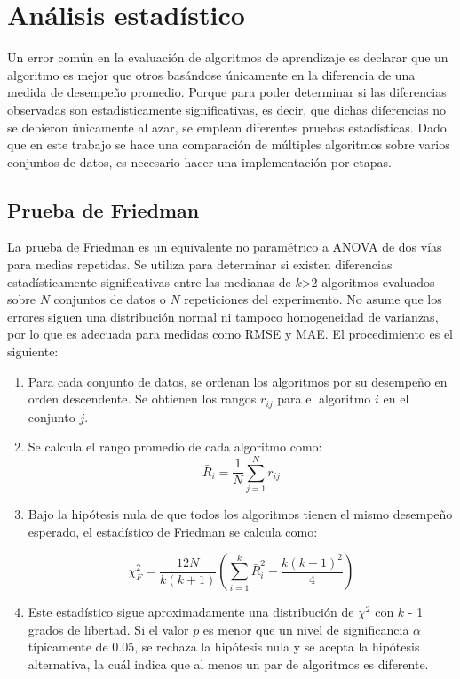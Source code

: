 \section{Análisis estadístico}

Un error común en la evaluación de algoritmos de aprendizaje es declarar que un algoritmo es mejor que otros basándose únicamente en la diferencia de una medida de desempeño promedio. Porque para poder determinar si las diferencias observadas son estadísticamente significativas, es decir, que dichas diferencias no se debieron únicamente al azar, se emplean diferentes pruebas estadísticas. Dado que en este trabajo se hace una comparación de múltiples algoritmos sobre varios conjuntos de datos, es necesario hacer una implementación por etapas.

\subsection{Prueba de Friedman}

La prueba de Friedman es un equivalente no paramétrico a ANOVA de dos vías para medias repetidas. Se utiliza para determinar si existen diferencias estadísticamente significativas entre las medianas de $k$>2 algoritmos evaluados sobre $N$ conjuntos de datos o $N$ repeticiones del experimento. No asume que los errores siguen una distribución normal ni tampoco homogeneidad de varianzas, por lo que es adecuada para medidas como RMSE y MAE. El procedimiento es el siguiente:

\begin{enumerate}
    \item Para cada conjunto de datos, se ordenan los algoritmos por su desempeño en orden descendente. Se obtienen los rangos $r_{ij}$ para el algoritmo $i$ en el conjunto $j$.

    \item Se calcula el rango promedio de cada algoritmo como:
\[
\bar{R}_i = \frac{1}{N} \sum_{j=1}^{N} r_{ij}
\]

    \item Bajo la hipótesis nula de que todos los algoritmos tienen el mismo desempeño esperado, el estadístico de Friedman se calcula como:

\[
\chi_F^2 = \frac{12N}{k(k+1)} \left( \sum_{i=1}^{k} \bar{R}_i^{2} - \frac{k(k+1)^{2}}{4} \right)
\]

    \item Este estadístico sigue aproximadamente una distribución de $\chi^2$ con $k$ - 1 grados de libertad. Si el valor $p$ es menor que un nivel de significancia $\alpha$ típicamente de 0.05, se rechaza la hipótesis nula y se acepta la hipótesis alternativa, la cuál indica que al menos un par de algoritmos es diferente.

\end{enumerate}

